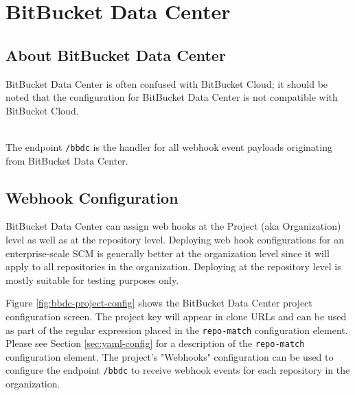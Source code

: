 \chapter{BitBucket Data Center}

\section{About BitBucket Data Center}

BitBucket Data Center is often confused with BitBucket Cloud; it should be noted that
the \cxoneflow configuration for BitBucket Data Center is not compatible with BitBucket Cloud.

\noindent\\The \cxoneflow endpoint \texttt{/bbdc} is the handler for all webhook event
payloads originating from BitBucket Data Center.  


\section{Webhook Configuration}

BitBucket Data Center can assign web hooks at the Project (aka Organization) level as well as at the
repository level.  Deploying web hook configurations for an enterprise-scale SCM is generally better
at the organization level since it will apply to all repositories in the organization.  Deploying
at the repository level is mostly suitable for testing purposes only.

Figure \ref{fig:bbdc-project-config} shows the BitBucket Data Center project configuration screen.  The
project key will appear in clone URLs and can be used as part of the regular expression 
placed in the \texttt{repo-match} configuration element.  Please see Section \ref{sec:yaml-config} 
for a description of the \texttt{repo-match} configuration element. The project's "Webhooks" configuration
can be used to configure the \cxoneflow endpoint \texttt{/bbdc} to receive webhook events for each repository in the organization.  

